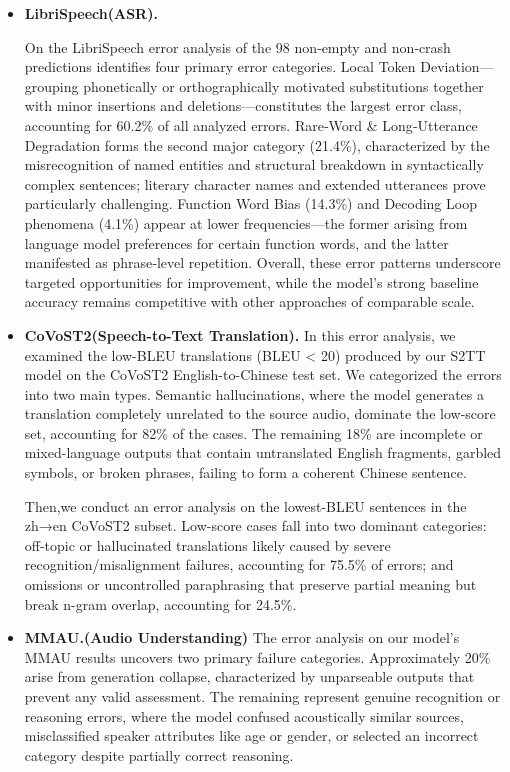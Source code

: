 \documentclass{article}
\begin{document}
\label{app:analysis:err:breakdown}
\begin{itemize}[leftmargin=0.5em,label=\textbullet,itemsep=0.35em,topsep=0.35em]
    \item \textbf{LibriSpeech(ASR).}
  
  On the LibriSpeech  error analysis of the 98 non‑empty and non‑crash predictions identifies four primary error categories. Local Token Deviation—grouping phonetically or orthographically motivated substitutions together with minor insertions and deletions—constitutes the largest error class, accounting for 60.2\% of all analyzed errors. Rare‑Word \& Long‑Utterance Degradation forms the second major category (21.4\%), characterized by the misrecognition of named entities and structural breakdown in syntactically complex sentences; literary character names and extended utterances prove particularly challenging. Function Word Bias (14.3\%) and Decoding Loop phenomena (4.1\%) appear at lower frequencies—the former arising from language model preferences for certain function words, and the latter manifested as phrase‑level repetition. Overall, these error patterns underscore targeted opportunities for improvement, while the model's strong baseline accuracy remains competitive with other approaches of comparable scale. 
  
    \item \textbf{CoVoST2(Speech-to-Text Translation).}
    In this error analysis, we examined the low-BLEU translations (BLEU < 20) produced by our S2TT model on the CoVoST2 English-to-Chinese test set. We categorized the errors into two main types. Semantic hallucinations, where the model generates a translation completely unrelated to the source audio, dominate the low-score set, accounting for 82\% of the cases. The remaining 18\% are incomplete or mixed-language outputs that contain untranslated English fragments, garbled symbols, or broken phrases, failing to form a coherent Chinese sentence. 

    Then,we conduct an error analysis on the lowest-BLEU  sentences in the zh→en CoVoST2 subset. Low-score cases fall into two dominant categories:  off-topic or hallucinated translations likely caused by severe recognition/misalignment failures, accounting for 75.5\% of errors;  and omissions or uncontrolled paraphrasing that preserve partial meaning but break n-gram overlap, accounting for 24.5\%. 

    \item \textbf{MMAU.(Audio Understanding)}
    The error analysis on our model's MMAU results uncovers two primary failure categories. Approximately 20\% arise from generation collapse, characterized by unparseable outputs that prevent any valid assessment. The remaining  represent genuine recognition or reasoning errors, where the model confused acoustically similar sources, misclassified speaker attributes like age or gender, or selected an incorrect category despite partially correct reasoning.


\end{itemize}
\end{document}
